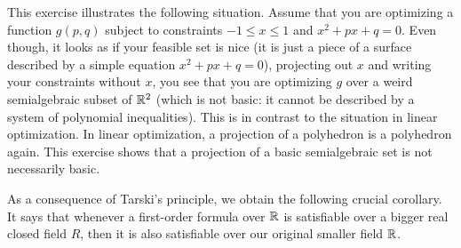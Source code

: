 \begin{solution}
\begin{center}
	\end{center}

	This exercise illustrates the following situation. Assume that you are optimizing a function $g(p,q)$ subject to constraints $-1 \le x \le 1$ and $x^2 + p x + q =0$. Even though, it looks as if your feasible set is nice (it is just a piece of a surface described by a simple equation $x^2 + p x + q =0$), projecting out $x$ and writing your constraints without $x$, you see that you are optimizing $g$ over a weird semialgebraic subset of $\mathbb{R}^2$ (which is not basic: it cannot be described by a system of polynomial inequalities). This is in contrast to the situation in linear optimization. In linear optimization, a projection of a polyhedron is a polyhedron again. This exercise shows that a projection of a basic semialgebraic set is not necessarily basic. 
\end{solution}

As a consequence of Tarski's principle, we obtain the following crucial corollary. It says that whenever a first-order formula over $\mathbb{R}$ is satisfiable over a bigger real closed field $R$, then it is also satisfiable over our original smaller field $\mathbb{R}$. 

